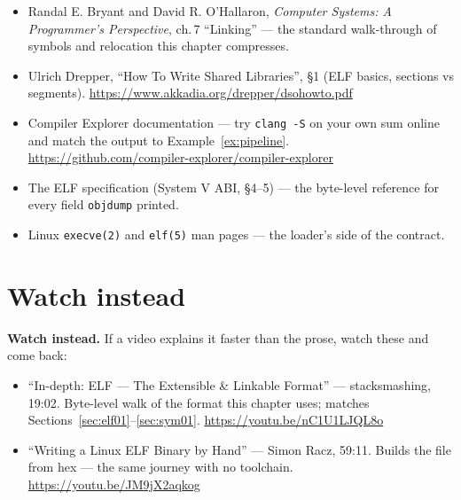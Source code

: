 \begin{itemize}
  \item Randal E. Bryant and David R. O'Hallaron, \emph{Computer Systems:
        A Programmer's Perspective}, ch.\,7 ``Linking'' --- the standard
        walk-through of symbols and relocation this chapter compresses.
  \item Ulrich Drepper, ``How To Write Shared Libraries'', \S1
        (ELF basics, sections vs segments).
        \url{https://www.akkadia.org/drepper/dsohowto.pdf}
  \item Compiler Explorer documentation --- try \texttt{clang -S} on your
        own sum online and match the output to Example~\ref{ex:pipeline}.
        \url{https://github.com/compiler-explorer/compiler-explorer}
  \item The ELF specification (System V ABI, \S4--5) --- the byte-level
        reference for every field \texttt{objdump} printed.
  \item Linux \texttt{execve(2)} and \texttt{elf(5)} man pages ---
        the loader's side of the contract.
\end{itemize}

\section*{Watch instead}
\label{sec:watch01}

\begin{rulebox}
\textbf{Watch instead.} If a video explains it faster than the prose,
watch these and come back:
\begin{itemize}
  \item ``In-depth: ELF --- The Extensible \& Linkable Format'' ---
        stacksmashing, 19:02. Byte-level walk of the format this
        chapter uses; matches Sections~\ref{sec:elf01}--\ref{sec:sym01}.
        \url{https://youtu.be/nC1U1LJQL8o}
  \item ``Writing a Linux ELF Binary by Hand'' --- Simon Racz, 59:11.
        Builds the file from hex --- the same journey with no toolchain.
        \url{https://youtu.be/JM9jX2aqkog}
\end{itemize}
\end{rulebox}

\chapternotes
